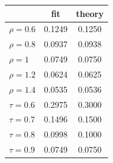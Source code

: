 \documentclass[8pt,twocolumn]{article}
\begin{document}
\begin{table}
\begin{center}
\setlength{\tabcolsep}{20pt}
\begin{tabular}{lcc}
 & fit & theory \\
\hline
$\rho = 0.6$ & 0.1249 & 0.1250 \\
$\rho = 0.8$ & 0.0937 & 0.0938 \\
$\rho = 1$   & 0.0749 & 0.0750 \\
$\rho = 1.2$ & 0.0624 & 0.0625 \\
$\rho = 1.4$ & 0.0535 & 0.0536 \\
\hline
$\tau = 0.6$ & 0.2975 & 0.3000 \\
$\tau = 0.7$ & 0.1496 & 0.1500 \\
$\tau = 0.8$ & 0.0998 & 0.1000 \\
$\tau = 0.9$ & 0.0749 & 0.0750
\end{tabular}
\end{center}
\label{tab:results}
\end{table}
\end{document}
